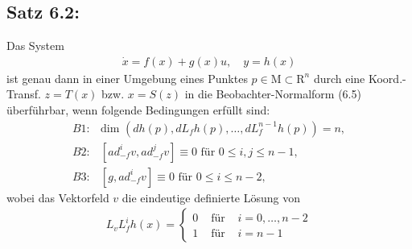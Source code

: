 \documentclass[ngerman]{tudscrreprt}
\begin{document}
\subsection*{Satz 6.2:}Das System \begin{align*}
\dot x = f(x) + g(x)u, \quad y= h(x) \tag{6.9}
\end{align*}
ist genau dann in einer Umgebung eines Punktes $p \in \mathrm{M}\subset \mathrm{R}^n$ durch eine Koord.-Transf. $z = T(x)$ bzw. $x = S(z)$ in die Beobachter-Normalform (6.5) überführbar, wenn folgende Bedingungen erfüllt sind: \begin{align*}
B1: &\text{dim }(dh(p), dL_fh(p),\dots, dL_f^{n-1} h(p)) = n,\\ 
B2: &[ad_{-f}^i  v, ad_{-f}^j v]\equiv 0\text{ für } 0\le i,j \le n-1,\\ 
B3: &[g, ad_{-f}^i v] \equiv 0 \text{ für } 0\le i \le n-2,
\end{align*}
wobei das Vektorfeld $v$ die eindeutige definierte Lösung von 
\begin{align*}
L_v L_f^i h(x) = \left\{
\begin{matrix} 0 &\text{ für } & i=0,\dots, n-2\\ 
1 & \text{ für } & i=n-1\end{matrix}
\right.
\end{align*}
\end{document}
